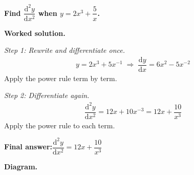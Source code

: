 \documentclass[11pt]{article}
\newcommand{\question}[1]{\par\medskip\noindent\textbf{#1}\par}
\begin{document}
\question{Find \( \dfrac{\mathrm{d}^2y}{\mathrm{d}x^2} \) when \( y = 2x^3 + \dfrac{5}{x} \).}

\textbf{Worked solution.}

\textit{Step 1: Rewrite and differentiate once.}
\[\begin{gathered}
y = 2x^3 + 5x^{-1} \;\Rightarrow\; \dfrac{\mathrm{d}y}{\mathrm{d}x} = 6x^2 - 5x^{-2}
\end{gathered}\]
Apply the power rule term by term.

\textit{Step 2: Differentiate again.}
\[\begin{gathered}
\dfrac{\mathrm{d}^2y}{\mathrm{d}x^2} = 12x + 10x^{-3} = 12x + \dfrac{10}{x^3}
\end{gathered}\]
Apply the power rule to each term.

\begin{answerbox}
\textbf{Final answer:}\quad \(\displaystyle  \dfrac{\mathrm{d}^2y}{\mathrm{d}x^2} = 12x + \dfrac{10}{x^3} \)
\end{answerbox}
\textbf{Diagram.}
\end{document}
